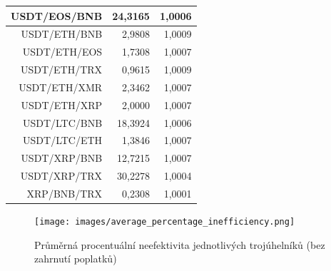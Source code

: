 \documentclass[thesis=B,czech]{FITthesis}[2019/03/21]
\begin{document}
\begin{table}
\begin{tabular}{|| r | r | r ||}
 \hline USDT/EOS/BNB & 24,3165 & 1,0006\\ 
 \hline USDT/ETH/BNB & 2,9808 & 1,0009\\ 
 \hline USDT/ETH/EOS & 1,7308 & 1,0007\\ 
 \hline USDT/ETH/TRX & 0,9615 & 1,0009\\ 
 \hline USDT/ETH/XMR & 2,3462 & 1,0007\\ 
 \hline USDT/ETH/XRP & 2,0000 & 1,0007\\ 
 \hline USDT/LTC/BNB & 18,3924 & 1,0006\\ 
 \hline USDT/LTC/ETH & 1,3846 & 1,0007\\ 
 \hline USDT/XRP/BNB & 12,7215 & 1,0007\\ 
 \hline USDT/XRP/TRX & 30,2278 & 1,0004\\ 
 \hline XRP/BNB/TRX & 0,2308 & 1,0001\\ 
 \hline
\end{tabular}
\end{table}

\begin{figure}\centering
	\texttt{[image: images/average\_percentage\_inefficiency.png]}
	\caption{Průměrná procentuální neefektivita jednotlivých trojúhelníků (bez zahrnutí poplatků)}\label{average_percentage_inefficiency}
\end{figure}
\end{document}

